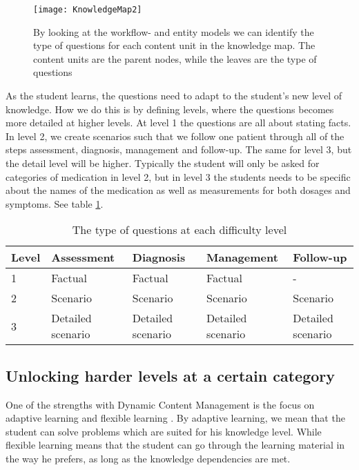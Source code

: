 \begin{figure}[h!]
	\texttt{[image: KnowledgeMap2]}
	\caption {By looking at the workflow- and entity models we can identify the type of questions for each content unit in the knowledge map. The content units are the parent nodes, while the leaves are the type of questions}
	\label{fig:ExpandedKnowledgeMap}
\end{figure}

As the student learns, the questions need to adapt to the student's new level of knowledge. How we do this is by defining levels, where the questions becomes more detailed at higher levels. At level 1 the questions are all about stating facts. In level 2, we create scenarios such that we follow one patient through all of the steps assessment, diagnosis, management and follow-up. The same for level 3, but the detail level will be higher. Typically the student will only be asked for categories of medication in level 2, but in level 3 the students needs to be specific about the names of the medication as well as measurements for both dosages and symptoms. See table \ref{table:ProgressionGranularity}.

\begin{table}[h!]	
	\begin{tabular}{|m{2em}|m{6em}|m{6em}|m{6em}|m{6em}|}
		\hline
		Level & Assessment & Diagnosis & Management & Follow-up \\
		\hline
		1  & Factual & Factual & Factual & - \\
		2 & Scenario & Scenario & Scenario & Scenario \\
		3 & Detailed scenario  & Detailed scenario & Detailed scenario & Detailed scenario \\
		\hline
	\end{tabular}
	\caption{The type of questions at each difficulty level}
	\label{table:ProgressionGranularity}
\end{table}




\subsection{Unlocking harder levels at a certain category}
One of the strengths with Dynamic Content Management is the focus on adaptive learning and flexible learning \parencite{Eide2008}. By adaptive learning, we mean that the student can solve problems which are suited for his knowledge level. While flexible learning means that the student can go through the learning material in the way he prefers, as long as the knowledge dependencies are met.

